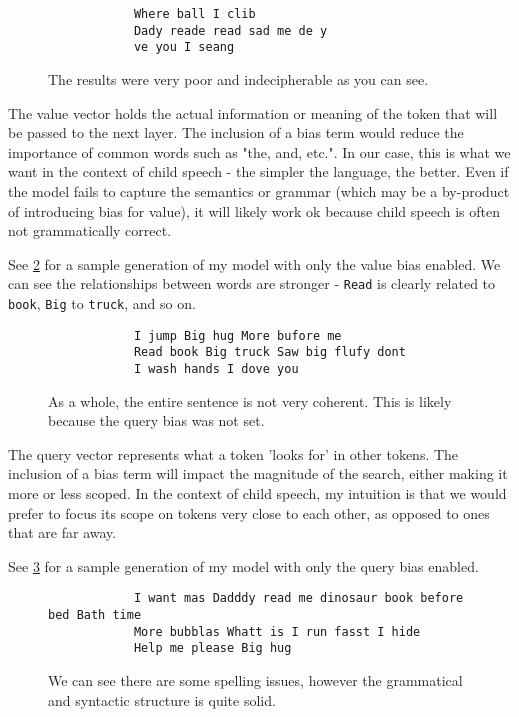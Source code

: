 \documentclass{article}  %
\begin{document}
	\begin{figure}[H]
		\begin{verbatim}
			Where ball I clib
			Dady reade read sad me de y
			ve you I seang
		\end{verbatim}
		\caption{The results were very poor and indecipherable as you can see.}
		\label{key-bias-example}
	\end{figure}
	
	The value vector holds the actual information or meaning of the token that will be passed to the next layer. The inclusion of a bias term would reduce the importance of common words such as "the, and, etc.". In our case, this is what we want in the context of child speech - the simpler the language, the better. Even if the model fails to capture the semantics or grammar (which may be a by-product of introducing bias for value), it will likely work ok because child speech is often not grammatically correct.
	
	See \ref{value-bias-example} for a sample generation of my model with only the value bias enabled. We can see the relationships between words are stronger - \verb|Read| is clearly related to \verb|book|, \verb|Big| to \verb|truck|, and so on.
	
	\begin{figure}[H]
		\begin{verbatim}
			I jump Big hug More bufore me
			Read book Big truck Saw big flufy dont
			I wash hands I dove you
		\end{verbatim}
		\caption{As a whole, the entire sentence is not very coherent. This is likely because the query bias was not set.}
		\label{value-bias-example}
	\end{figure}
	
	The query vector represents what a token 'looks for' in other tokens. The inclusion of a bias term will impact the magnitude of the search, either making it more or less scoped. In the context of child speech, my intuition is that we would prefer to focus its scope on tokens very close to each other, as opposed to ones that are far away.
	
	See \ref{query-bias-example} for a sample generation of my model with only the query bias enabled.
	
	\begin{figure}[H]
		\begin{verbatim}
			I want mas Dadddy read me dinosaur book before bed Bath time
			More bubblas Whatt is I run fasst I hide
			Help me please Big hug
		\end{verbatim}
		\caption{We can see there are some spelling issues, however the grammatical and syntactic structure is quite solid.}
		\label{query-bias-example}
	\end{figure}
	
\end{document}
